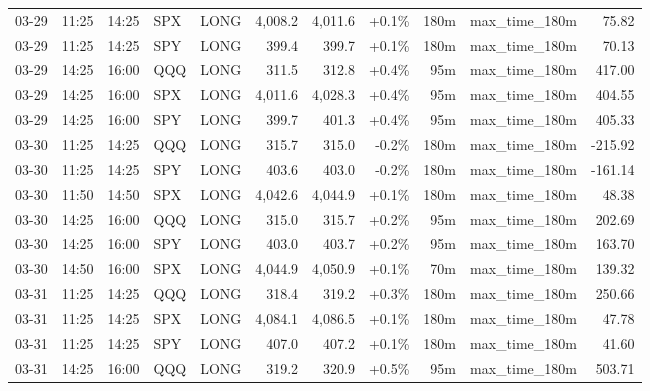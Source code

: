 \documentclass[11pt,a4paper,twoside]{article}
\begin{document}
\begin{center}
\begin{longtable}{>{\color{txtmain}}l l l l l r r r r >{\color{txtmain}}l r}
03-29 & 11:25 & 14:25 & SPX & LONG & 4,008.2 & 4,011.6 & \textcolor{wingreen}{+0.1\%} & 180m & max\_time\_180m & \textcolor{wingreen}{75.82} \\
03-29 & 11:25 & 14:25 & SPY & LONG & 399.4 & 399.7 & \textcolor{wingreen}{+0.1\%} & 180m & max\_time\_180m & \textcolor{wingreen}{70.13} \\
03-29 & 14:25 & 16:00 & QQQ & LONG & 311.5 & 312.8 & \textcolor{wingreen}{+0.4\%} & 95m & max\_time\_180m & \textcolor{wingreen}{417.00} \\
03-29 & 14:25 & 16:00 & SPX & LONG & 4,011.6 & 4,028.3 & \textcolor{wingreen}{+0.4\%} & 95m & max\_time\_180m & \textcolor{wingreen}{404.55} \\
03-29 & 14:25 & 16:00 & SPY & LONG & 399.7 & 401.3 & \textcolor{wingreen}{+0.4\%} & 95m & max\_time\_180m & \textcolor{wingreen}{405.33} \\
03-30 & 11:25 & 14:25 & QQQ & LONG & 315.7 & 315.0 & \textcolor{lossred}{-0.2\%} & 180m & max\_time\_180m & \textcolor{lossred}{-215.92} \\
03-30 & 11:25 & 14:25 & SPY & LONG & 403.6 & 403.0 & \textcolor{lossred}{-0.2\%} & 180m & max\_time\_180m & \textcolor{lossred}{-161.14} \\
03-30 & 11:50 & 14:50 & SPX & LONG & 4,042.6 & 4,044.9 & \textcolor{wingreen}{+0.1\%} & 180m & max\_time\_180m & \textcolor{wingreen}{48.38} \\
03-30 & 14:25 & 16:00 & QQQ & LONG & 315.0 & 315.7 & \textcolor{wingreen}{+0.2\%} & 95m & max\_time\_180m & \textcolor{wingreen}{202.69} \\
03-30 & 14:25 & 16:00 & SPY & LONG & 403.0 & 403.7 & \textcolor{wingreen}{+0.2\%} & 95m & max\_time\_180m & \textcolor{wingreen}{163.70} \\
03-30 & 14:50 & 16:00 & SPX & LONG & 4,044.9 & 4,050.9 & \textcolor{wingreen}{+0.1\%} & 70m & max\_time\_180m & \textcolor{wingreen}{139.32} \\
03-31 & 11:25 & 14:25 & QQQ & LONG & 318.4 & 319.2 & \textcolor{wingreen}{+0.3\%} & 180m & max\_time\_180m & \textcolor{wingreen}{250.66} \\
03-31 & 11:25 & 14:25 & SPX & LONG & 4,084.1 & 4,086.5 & \textcolor{wingreen}{+0.1\%} & 180m & max\_time\_180m & \textcolor{wingreen}{47.78} \\
03-31 & 11:25 & 14:25 & SPY & LONG & 407.0 & 407.2 & \textcolor{wingreen}{+0.1\%} & 180m & max\_time\_180m & \textcolor{wingreen}{41.60} \\
03-31 & 14:25 & 16:00 & QQQ & LONG & 319.2 & 320.9 & \textcolor{wingreen}{+0.5\%} & 95m & max\_time\_180m & \textcolor{wingreen}{503.71} \\

\end{longtable}
\end{center}
\end{document}
